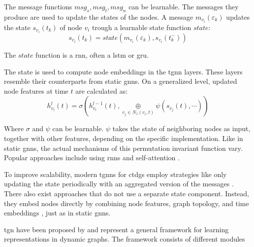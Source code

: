 The message functions $msg_s, msg_t, msg_n$ can be learnable. The messages they produce are used to update the states of the nodes. A message $m_{v_i}(\varepsilon_{k})$ updates the state $s_{v_i}(t_k)$ of node $v_i$ trough a learnable state function $state$:
\begin{equation}
    s_{v_i}(t_k) = state(m_{v_i}(\varepsilon_{k}), s_{v_i}(t_k^-))
\end{equation}

The $state$ function is a \gls{rnn}, often a \gls{lstm} or \gls{gru}.

The state is used to compute node embeddings in the \gls{tgnn} layers. These layers resemble their counterparts from static \glspl{gnn}. On a generalized level, updated node features at time $t$ are calculated as:
\begin{equation}
    h_{v_i}^l(t) = \sigma(h_{v_i}^{l-1}(t), \underset{v_j \in N_1(v_i, t)}{\oplus} \psi(s_{v_j}(t), \cdots))
\end{equation}

Where $\sigma$ and $\psi$ can be learnable. $\psi$ takes the state of neighboring nodes as input, together with other features, depending on the specific implementation. Like in static \glspl{gnn}, the actual mechanisms of this permutation invariant function vary. Popular approaches include using \glspl{rnn} \cite{ma_streaming_2018} and self-attention \cite{rossi_temporal_2020}.

To improve scalability, modern \glspl{tgnn} for \glspl{ctdg} employ strategies like only updating the state periodically with an aggregated version of the messages \cite{rossi_temporal_2020}. There also exist approaches that do not use a separate state component. Instead, they embed nodes directly by combining node features, graph topology, and time embeddings \cite{longa_graph_2023, xu_inductive_2020}, just as in static \glspl{gnn}.




\iffalse
\gls{tgn} have been proposed by \cite{rossi_temporal_2020} and represent a general framework for learning representations in dynamic graphs. The framework consists of different modules

